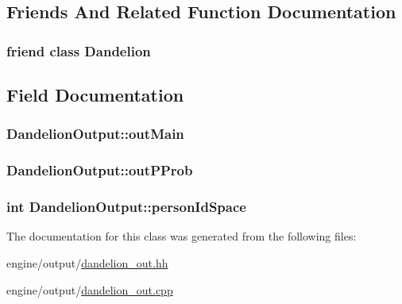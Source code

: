 \subsection{Friends And Related Function Documentation}
\hypertarget{classDandelionOutput_a3d9ee1085aff51099ffe0efd4b300c8f}{
\subsubsection[{Dandelion}]{\setlength{\rightskip}{0pt plus 5cm}friend class {\bf Dandelion}}}
\label{classDandelionOutput_a3d9ee1085aff51099ffe0efd4b300c8f}


\subsection{Field Documentation}
\hypertarget{classDandelionOutput_a51a7cd7b94daf399744a2bd091dbc893}{
\subsubsection[{outMain}]{ {\bf DandelionOutput::outMain}}}
\label{classDandelionOutput_a51a7cd7b94daf399744a2bd091dbc893}
\hypertarget{classDandelionOutput_a4600b137430cebc7b8d5926d516584a5}{
\subsubsection[{outPProb}]{ {\bf DandelionOutput::outPProb}}}
\label{classDandelionOutput_a4600b137430cebc7b8d5926d516584a5}
\hypertarget{classDandelionOutput_a3e9b9fa7f56b76760797e6a5e9ca84c9}{
\subsubsection[{personIdSpace}]{\setlength{\rightskip}{0pt plus 5cm}int {\bf DandelionOutput::personIdSpace}}}
\label{classDandelionOutput_a3e9b9fa7f56b76760797e6a5e9ca84c9}


The documentation for this class was generated from the following files:\begin{DoxyCompactItemize}
\item 
engine/output/\hyperlink{dandelion__out_8hh}{dandelion\_\-out.hh}\item 
engine/output/\hyperlink{dandelion__out_8cpp}{dandelion\_\-out.cpp}\end{DoxyCompactItemize}
